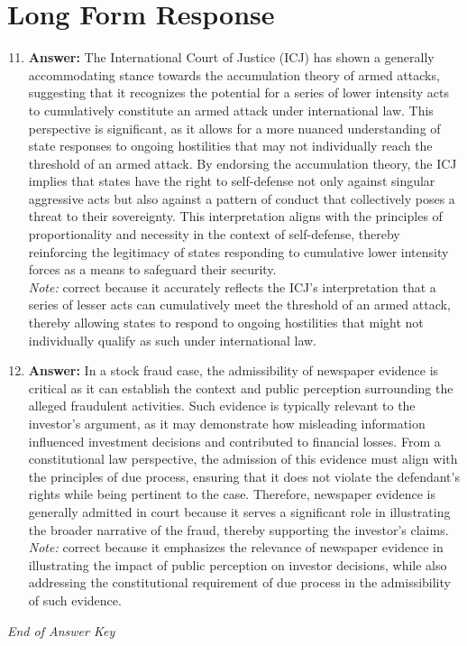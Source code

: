\documentclass[12pt]{article}
\begin{document}
\section*{Long Form Response}
\begin{enumerate}[label=\arabic*.]
\setcounter{enumi}{10}
\item \textbf{Answer:} The International Court of Justice (ICJ) has shown a generally accommodating stance towards the accumulation theory of armed attacks, suggesting that it recognizes the potential for a series of lower intensity acts to cumulatively constitute an armed attack under international law. This perspective is significant, as it allows for a more nuanced understanding of state responses to ongoing hostilities that may not individually reach the threshold of an armed attack. By endorsing the accumulation theory, the ICJ implies that states have the right to self-defense not only against singular aggressive acts but also against a pattern of conduct that collectively poses a threat to their sovereignty. This interpretation aligns with the principles of proportionality and necessity in the context of self-defense, thereby reinforcing the legitimacy of states responding to cumulative lower intensity forces as a means to safeguard their security.
\\ \textit{Note:} correct because it accurately reflects the ICJ's interpretation that a series of lesser acts can cumulatively meet the threshold of an armed attack, thereby allowing states to respond to ongoing hostilities that might not individually qualify as such under international law.
\item \textbf{Answer:} In a stock fraud case, the admissibility of newspaper evidence is critical as it can establish the context and public perception surrounding the alleged fraudulent activities. Such evidence is typically relevant to the investor's argument, as it may demonstrate how misleading information influenced investment decisions and contributed to financial losses. From a constitutional law perspective, the admission of this evidence must align with the principles of due process, ensuring that it does not violate the defendant's rights while being pertinent to the case. Therefore, newspaper evidence is generally admitted in court because it serves a significant role in illustrating the broader narrative of the fraud, thereby supporting the investor's claims.
\\ \textit{Note:} correct because it emphasizes the relevance of newspaper evidence in illustrating the impact of public perception on investor decisions, while also addressing the constitutional requirement of due process in the admissibility of such evidence.
\end{enumerate}

\vfill
\noindent\textit{End of Answer Key}
\end{document}
